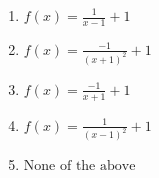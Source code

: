 \documentclass[14pt]{extbook}
\begin{document}
\begin{enumerate}
{\begin{center}
\end{center}
\begin{enumerate}[label=\Alph*.]
\item \( f(x) = \frac{1}{x - 1} + 1 \)
\item \( f(x) = \frac{-1}{(x + 1)^2} + 1 \)
\item \( f(x) = \frac{-1}{x + 1} + 1 \)
\item \( f(x) = \frac{1}{(x - 1)^2} + 1 \)
\item \( \text{None of the above} \)

\end{enumerate} }
\end{enumerate}
\end{document}
